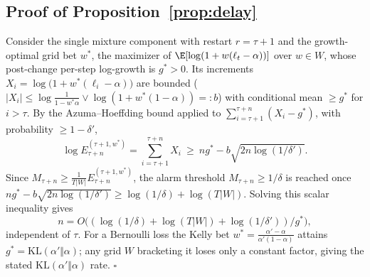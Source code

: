 \subsection{Proof of Proposition~\ref{prop:delay}}
Consider the single mixture component with restart $r = \tau + 1$ and
the growth-optimal grid bet $w^\ast$, the maximizer of
$\E[\log(1 + w(\ell_t - \alpha))]$ over $w \in W$,
whose post-change per-step
log-growth is $g^\ast > 0$. Its increments
$X_i = \log\big(1 + w^\ast(\ell_i - \alpha)\big)$ are bounded
($|X_i| \le \log\frac{1}{1-w^\ast\alpha} \vee
\log(1 + w^\ast(1-\alpha)) =: b$) with conditional mean $\ge g^\ast$
for $i > \tau$. By the Azuma--Hoeffding bound applied to
$\sum_{i=\tau+1}^{\tau+n}(X_i - g^\ast)$, with probability
$\ge 1 - \delta'$,
\[
\log E_{\tau+n}^{(\tau+1, w^\ast)}
= \sum_{i=\tau+1}^{\tau+n} X_i
\ \ge\ n g^\ast - b\sqrt{2 n \log(1/\delta')}.
\]
Since $M_{\tau+n} \ge \frac{1}{T|W|}E_{\tau+n}^{(\tau+1,w^\ast)}$, the
alarm threshold $M_{\tau+n} \ge 1/\delta$ is reached once
$n g^\ast - b\sqrt{2 n \log(1/\delta')} \ge \log(1/\delta) +
\log(T|W|)$. Solving this scalar inequality gives
\[
n = O\big((\log(1/\delta) + \log(T|W|) +
\log(1/\delta'))/g^\ast\big),
\]
independent of $\tau$. For a Bernoulli
loss the Kelly bet
$w^\ast = \frac{\alpha'-\alpha}{\alpha'(1-\alpha)}$ attains
$g^\ast = \mathrm{KL}(\alpha' \Vert \alpha)$; any grid $W$ bracketing
it loses only a constant factor, giving the stated
$\mathrm{KL}(\alpha'\Vert\alpha)$ rate. \hfill$\square$

